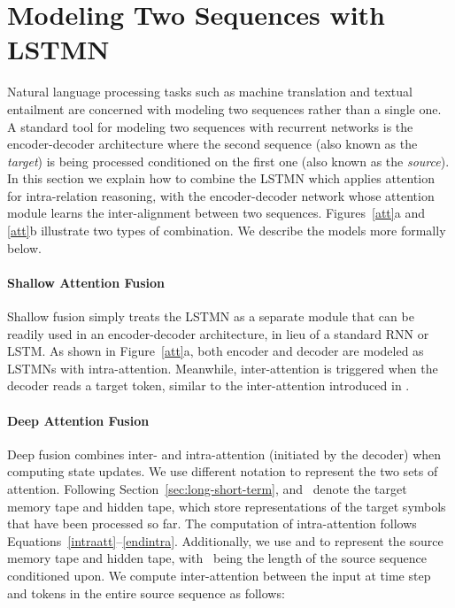 \documentclass[11pt,letterpaper]{article}
\begin{document}
	
	

	\section{Modeling Two Sequences with LSTMN}
	\label{sec:lstmns-dual-sequence}
	
	Natural language processing tasks such as machine translation
        and textual entailment are concerned with modeling two
        sequences rather than a single one. A standard tool for
        modeling two sequences with recurrent networks is the
        encoder-decoder architecture where the second sequence (also
        known as the \textit{target}) is being processed conditioned
        on the first one (also known as the \textit{source}). In this
        section we explain how to combine the LSTMN which applies
        attention for intra-relation reasoning, with the
        encoder-decoder network whose attention module learns the
        inter-alignment between two sequences. Figures~\ref{att}a and
        \ref{att}b illustrate two types of combination. We describe the
        models more formally below. 
	
	\paragraph{Shallow Attention Fusion}      
        Shallow fusion simply treats the LSTMN as a separate module
        that can be readily used in an encoder-decoder architecture,
        in lieu of a standard RNN or LSTM. As shown in
        Figure~\ref{att}a, both encoder and decoder are modeled as
        LSTMNs with intra-attention. Meanwhile, inter-attention is
        triggered when the decoder reads a target token, similar to
        the inter-attention introduced in
        .
	
	\paragraph{Deep Attention Fusion} Deep fusion combines inter-
        and intra-attention (initiated by the decoder) when computing
        state updates.  We use different notation to represent the two
        sets of attention.  Following
        Section~\ref{sec:long-short-term},  and~ denote the
        target memory tape and hidden tape, which store
        representations of the target symbols that have been processed
        so far.  The computation of intra-attention follows
        Equations~\eqref{intraatt}--\eqref{endintra}.  Additionally, we
        use  and  to represent the source memory tape and hidden
        tape, with~ being the length of the source sequence
        conditioned upon. We compute inter-attention between the input
        at time step~ and tokens in the entire source sequence as
        follows:
	
\end{document}
